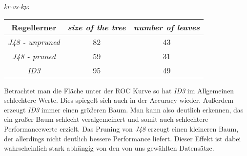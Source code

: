 \emph{kr-vs-kp}:
\begin{tabular}{c|c|c}
	Regellerner       & \emph{size of the tree} & \emph{number of leaves}  \\ \hline
	\emph{J48 - unpruned}  & 82 & 43 \\ \hline
	\emph{J48 - pruned} & 59  & 31 \\ \hline
	\emph{ID3}  & 95 & 49\\ \hline
\end{tabular}

Betrachtet man die Fl\"ache unter der ROC Kurve so hat \emph{ID3} im Allgemeinen schlechtere Werte. Dies spiegelt sich auch in der Accuracy wieder. Au\ss erdem erzeugt \emph{ID3} immer einen gr\"o\ss eren Baum. Man kann also deutlich erkennen, das ein gro\ss er Baum schlecht veralgemeinert und somit auch schlechtere Performancewerte erzielt. Das Pruning von \emph{J48} erzeugt einen kleineren Baum, der allerdings nicht deutlich bessere Performance liefert. Dieser Effekt ist dabei wahrscheinlich stark abh\"angig von den von uns gew\"ahlten Datens\"atze.